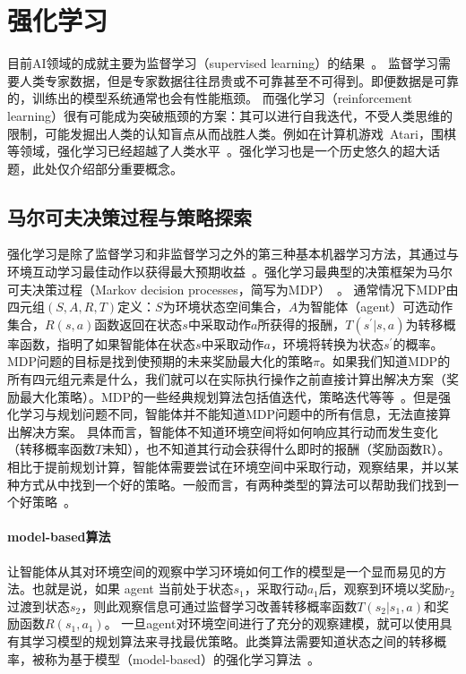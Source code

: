 \section{强化学习}
目前AI领域的成就主要为监督学习（supervised learning）的结果~\cite{NIPS2012_4824,resnet,hastie2009elements,lecun2015deep}。
监督学习需要人类专家数据，但是专家数据往往昂贵或不可靠甚至不可得到。即便数据是可靠的，训练出的模型系统通常也会有性能瓶颈。
而强化学习（reinforcement learning）很有可能成为突破瓶颈的方案：其可以进行自我迭代，不受人类思维的限制，可能发掘出人类的认知盲点从而战胜人类。例如在计算机游戏~Atari，围棋等领域，强化学习已经超越了人类水平~\cite{Silver2016}。强化学习也是一个历史悠久的超大话题，此处仅介绍部分重要概念。
\subsection{马尔可夫决策过程与策略探索}
强化学习是除了监督学习和非监督学习之外的第三种基本机器学习方法，其通过与环境互动学习最佳动作以获得最大预期收益~\cite{Sutton1998}。强化学习最典型的决策框架为马尔可夫决策过程（Markov decision processes，简写为MDP）~\cite{Bel}。
通常情况下MDP由四元组$(S,A,R,T)$定义：$S$为环境状态空间集合，$A$为智能体（agent）可选动作集合，$R(s,a)$函数返回在状态$s$中采取动作$a$所获得的报酬，$T(s^{\prime}|s,a)$为转移概率函数，指明了如果智能体在状态$s$中采取动作$a$，环境将转换为状态$s^{\prime}$的概率。
MDP问题的目标是找到使预期的未来奖励最大化的策略$\pi$。如果我们知道MDP的所有四元组元素是什么，我们就可以在实际执行操作之前直接计算出解决方案（奖励最大化策略）。MDP的一些经典规划算法包括值迭代，策略迭代等等~\cite{Sutton1998}。但是强化学习与规划问题不同，智能体并不能知道MDP问题中的所有信息，无法直接算出解决方案。
具体而言，智能体不知道环境空间将如何响应其行动而发生变化（转移概率函数$T$未知），也不知道其行动会获得什么即时的报酬（奖励函数R）。相比于提前规划计算，智能体需要尝试在环境空间中采取行动，观察结果，并以某种方式从中找到一个好的策略。一般而言，有两种类型的算法可以帮助我们找到一个好策略~\cite{rlbase}。

\paragraph{model-based算法}
让智能体从其对环境空间的观察中学习环境如何工作的模型是一个显而易见的方法。也就是说，如果 agent 当前处于状态$s_{1}$，采取行动$a_{1}$后，观察到环境以奖励$r_{2}$过渡到状态$s_{2}$，则此观察信息可通过监督学习改善转移概率函数$T(s_{2}|s_{1},a)$和奖励函数$R(s_{1},a_{1})$。
一旦agent对环境空间进行了充分的观察建模，就可以使用具有其学习模型的规划算法来寻找最优策略。此类算法需要知道状态之间的转移概率，被称为基于模型（model-based）的强化学习算法~\cite{moerland2021modelbased,606886,10.1162/089976602753712972}。
